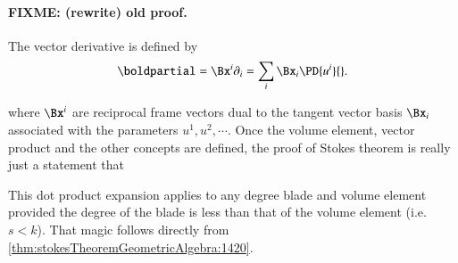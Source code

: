 %
%

\paragraph{FIXME: (rewrite) old proof.}
The vector derivative is defined by
\begin{equation}\label{eqn:stokesTheoremTheStatement:1400}
\boldpartial = \Bx^i \partial_i = \sum_i \Bx_i \PD{u^i}{}.
\end{equation}

where \( \Bx^i \) are reciprocal frame vectors dual to the tangent vector basis \( \Bx_i \) associated with the parameters \( u^1, u^2, \cdots \).
Once the volume element, vector product and the other concepts are defined, the proof of
Stokes theorem is really just a statement that

This dot product expansion applies to any degree blade and volume element provided the degree of the blade is less than that of the volume element (i.e. \(s < k\)).  That magic follows directly from \cref{thm:stokesTheoremGeometricAlgebra:1420}.
